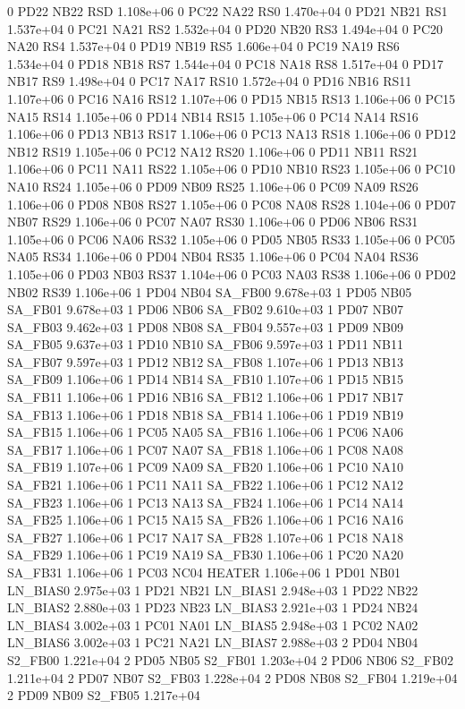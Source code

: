 0 PD22 NB22 RSD 1.108e+06 
0 PC22 NA22 RS0 1.470e+04 
0 PD21 NB21 RS1 1.537e+04 
0 PC21 NA21 RS2 1.532e+04 
0 PD20 NB20 RS3 1.494e+04 
0 PC20 NA20 RS4 1.537e+04 
0 PD19 NB19 RS5 1.606e+04 
0 PC19 NA19 RS6 1.534e+04 
0 PD18 NB18 RS7 1.544e+04 
0 PC18 NA18 RS8 1.517e+04 
0 PD17 NB17 RS9 1.498e+04 
0 PC17 NA17 RS10 1.572e+04 
0 PD16 NB16 RS11 1.107e+06 
0 PC16 NA16 RS12 1.107e+06 
0 PD15 NB15 RS13 1.106e+06 
0 PC15 NA15 RS14 1.105e+06 
0 PD14 NB14 RS15 1.105e+06 
0 PC14 NA14 RS16 1.106e+06 
0 PD13 NB13 RS17 1.106e+06 
0 PC13 NA13 RS18 1.106e+06 
0 PD12 NB12 RS19 1.105e+06 
0 PC12 NA12 RS20 1.106e+06 
0 PD11 NB11 RS21 1.106e+06 
0 PC11 NA11 RS22 1.105e+06 
0 PD10 NB10 RS23 1.105e+06 
0 PC10 NA10 RS24 1.105e+06 
0 PD09 NB09 RS25 1.106e+06 
0 PC09 NA09 RS26 1.106e+06 
0 PD08 NB08 RS27 1.105e+06 
0 PC08 NA08 RS28 1.104e+06 
0 PD07 NB07 RS29 1.106e+06 
0 PC07 NA07 RS30 1.106e+06 
0 PD06 NB06 RS31 1.105e+06 
0 PC06 NA06 RS32 1.105e+06 
0 PD05 NB05 RS33 1.105e+06 
0 PC05 NA05 RS34 1.106e+06 
0 PD04 NB04 RS35 1.106e+06 
0 PC04 NA04 RS36 1.105e+06 
0 PD03 NB03 RS37 1.104e+06 
0 PC03 NA03 RS38 1.106e+06 
0 PD02 NB02 RS39 1.106e+06 
1 PD04 NB04 SA_FB00 9.678e+03 
1 PD05 NB05 SA_FB01 9.678e+03 
1 PD06 NB06 SA_FB02 9.610e+03 
1 PD07 NB07 SA_FB03 9.462e+03 
1 PD08 NB08 SA_FB04 9.557e+03 
1 PD09 NB09 SA_FB05 9.637e+03 
1 PD10 NB10 SA_FB06 9.597e+03 
1 PD11 NB11 SA_FB07 9.597e+03 
1 PD12 NB12 SA_FB08 1.107e+06 
1 PD13 NB13 SA_FB09 1.106e+06 
1 PD14 NB14 SA_FB10 1.107e+06 
1 PD15 NB15 SA_FB11 1.106e+06 
1 PD16 NB16 SA_FB12 1.106e+06 
1 PD17 NB17 SA_FB13 1.106e+06 
1 PD18 NB18 SA_FB14 1.106e+06 
1 PD19 NB19 SA_FB15 1.106e+06 
1 PC05 NA05 SA_FB16 1.106e+06 
1 PC06 NA06 SA_FB17 1.106e+06 
1 PC07 NA07 SA_FB18 1.106e+06 
1 PC08 NA08 SA_FB19 1.107e+06 
1 PC09 NA09 SA_FB20 1.106e+06 
1 PC10 NA10 SA_FB21 1.106e+06 
1 PC11 NA11 SA_FB22 1.106e+06 
1 PC12 NA12 SA_FB23 1.106e+06 
1 PC13 NA13 SA_FB24 1.106e+06 
1 PC14 NA14 SA_FB25 1.106e+06 
1 PC15 NA15 SA_FB26 1.106e+06 
1 PC16 NA16 SA_FB27 1.106e+06 
1 PC17 NA17 SA_FB28 1.107e+06 
1 PC18 NA18 SA_FB29 1.106e+06 
1 PC19 NA19 SA_FB30 1.106e+06 
1 PC20 NA20 SA_FB31 1.106e+06 
1 PC03 NC04 HEATER 1.106e+06 
1 PD01 NB01 LN_BIAS0 2.975e+03 
1 PD21 NB21 LN_BIAS1 2.948e+03 
1 PD22 NB22 LN_BIAS2 2.880e+03 
1 PD23 NB23 LN_BIAS3 2.921e+03 
1 PD24 NB24 LN_BIAS4 3.002e+03 
1 PC01 NA01 LN_BIAS5 2.948e+03 
1 PC02 NA02 LN_BIAS6 3.002e+03 
1 PC21 NA21 LN_BIAS7 2.988e+03 
2 PD04 NB04 S2_FB00 1.221e+04 
2 PD05 NB05 S2_FB01 1.203e+04 
2 PD06 NB06 S2_FB02 1.211e+04 
2 PD07 NB07 S2_FB03 1.228e+04 
2 PD08 NB08 S2_FB04 1.219e+04 
2 PD09 NB09 S2_FB05 1.217e+04 
